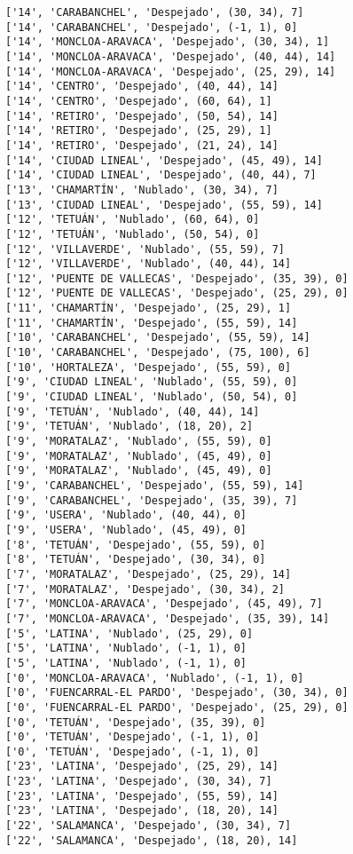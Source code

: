 \documentclass[11pt]{article}
\begin{document}
\begin{Verbatim}[commandchars=\\\{\}]
['14', 'CARABANCHEL', 'Despejado', (30, 34), 7]
['14', 'CARABANCHEL', 'Despejado', (-1, 1), 0]
['14', 'MONCLOA-ARAVACA', 'Despejado', (30, 34), 1]
['14', 'MONCLOA-ARAVACA', 'Despejado', (40, 44), 14]
['14', 'MONCLOA-ARAVACA', 'Despejado', (25, 29), 14]
['14', 'CENTRO', 'Despejado', (40, 44), 14]
['14', 'CENTRO', 'Despejado', (60, 64), 1]
['14', 'RETIRO', 'Despejado', (50, 54), 14]
['14', 'RETIRO', 'Despejado', (25, 29), 1]
['14', 'RETIRO', 'Despejado', (21, 24), 14]
['14', 'CIUDAD LINEAL', 'Despejado', (45, 49), 14]
['14', 'CIUDAD LINEAL', 'Despejado', (40, 44), 7]
['13', 'CHAMARTÍN', 'Nublado', (30, 34), 7]
['13', 'CIUDAD LINEAL', 'Despejado', (55, 59), 14]
['12', 'TETUÁN', 'Nublado', (60, 64), 0]
['12', 'TETUÁN', 'Nublado', (50, 54), 0]
['12', 'VILLAVERDE', 'Nublado', (55, 59), 7]
['12', 'VILLAVERDE', 'Nublado', (40, 44), 14]
['12', 'PUENTE DE VALLECAS', 'Despejado', (35, 39), 0]
['12', 'PUENTE DE VALLECAS', 'Despejado', (25, 29), 0]
['11', 'CHAMARTÍN', 'Despejado', (25, 29), 1]
['11', 'CHAMARTÍN', 'Despejado', (55, 59), 14]
['10', 'CARABANCHEL', 'Despejado', (55, 59), 14]
['10', 'CARABANCHEL', 'Despejado', (75, 100), 6]
['10', 'HORTALEZA', 'Despejado', (55, 59), 0]
['9', 'CIUDAD LINEAL', 'Nublado', (55, 59), 0]
['9', 'CIUDAD LINEAL', 'Nublado', (50, 54), 0]
['9', 'TETUÁN', 'Nublado', (40, 44), 14]
['9', 'TETUÁN', 'Nublado', (18, 20), 2]
['9', 'MORATALAZ', 'Nublado', (55, 59), 0]
['9', 'MORATALAZ', 'Nublado', (45, 49), 0]
['9', 'MORATALAZ', 'Nublado', (45, 49), 0]
['9', 'CARABANCHEL', 'Despejado', (55, 59), 14]
['9', 'CARABANCHEL', 'Despejado', (35, 39), 7]
['9', 'USERA', 'Nublado', (40, 44), 0]
['9', 'USERA', 'Nublado', (45, 49), 0]
['8', 'TETUÁN', 'Despejado', (55, 59), 0]
['8', 'TETUÁN', 'Despejado', (30, 34), 0]
['7', 'MORATALAZ', 'Despejado', (25, 29), 14]
['7', 'MORATALAZ', 'Despejado', (30, 34), 2]
['7', 'MONCLOA-ARAVACA', 'Despejado', (45, 49), 7]
['7', 'MONCLOA-ARAVACA', 'Despejado', (35, 39), 14]
['5', 'LATINA', 'Nublado', (25, 29), 0]
['5', 'LATINA', 'Nublado', (-1, 1), 0]
['5', 'LATINA', 'Nublado', (-1, 1), 0]
['0', 'MONCLOA-ARAVACA', 'Nublado', (-1, 1), 0]
['0', 'FUENCARRAL-EL PARDO', 'Despejado', (30, 34), 0]
['0', 'FUENCARRAL-EL PARDO', 'Despejado', (25, 29), 0]
['0', 'TETUÁN', 'Despejado', (35, 39), 0]
['0', 'TETUÁN', 'Despejado', (-1, 1), 0]
['0', 'TETUÁN', 'Despejado', (-1, 1), 0]
['23', 'LATINA', 'Despejado', (25, 29), 14]
['23', 'LATINA', 'Despejado', (30, 34), 7]
['23', 'LATINA', 'Despejado', (55, 59), 14]
['23', 'LATINA', 'Despejado', (18, 20), 14]
['22', 'SALAMANCA', 'Despejado', (30, 34), 7]
['22', 'SALAMANCA', 'Despejado', (18, 20), 14]

\end{Verbatim}
\end{document}
